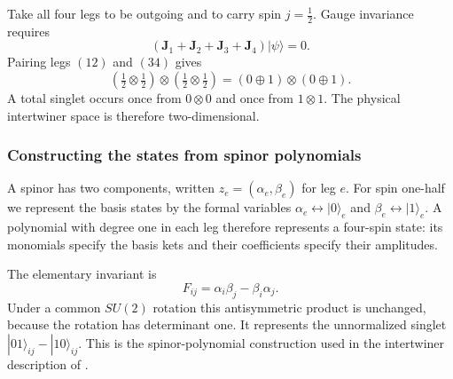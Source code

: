 Take all four legs to be outgoing and to carry spin $j=\tfrac12$.
Gauge invariance requires
\begin{equation}
 (\mathbf J_1+\mathbf J_2+\mathbf J_3+\mathbf J_4)|\psi\rangle=0.
\end{equation}
Pairing legs $(12)$ and $(34)$ gives
\begin{equation}\label{eqn:cg-decomp}
 (\tfrac12\otimes\tfrac12)\otimes(\tfrac12\otimes\tfrac12)
 =(0\oplus1)\otimes(0\oplus1).
\end{equation}
A total singlet occurs once from $0\otimes0$ and once from $1\otimes1$.
The physical intertwiner space is therefore two-dimensional.


\subsubsection{Constructing the states from spinor polynomials}

A spinor has two components, written $z_e=(\alpha_e,\beta_e)$ for leg $e$.
For spin one-half we represent the basis states by the formal variables
$\alpha_e\leftrightarrow|0\rangle_e$ and
$\beta_e\leftrightarrow|1\rangle_e$. A polynomial with degree one in each
leg therefore represents a four-spin state: its monomials specify the
basis kets and their coefficients specify their amplitudes.

The elementary invariant is
\begin{equation}
 F_{ij}=\alpha_i\beta_j-\beta_i\alpha_j.
\end{equation}
Under a common $SU(2)$ rotation this antisymmetric product is unchanged,
because the rotation has determinant one. It represents the unnormalized
singlet $|01\rangle_{ij}-|10\rangle_{ij}$. This is the spinor-polynomial
construction used in the intertwiner description of
\cite{DittrichHnybida2016Ising}.

